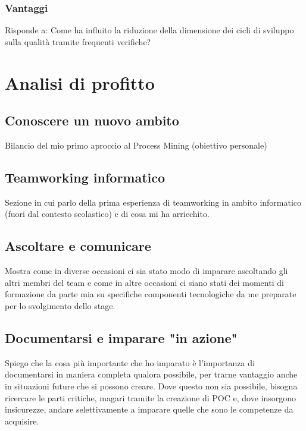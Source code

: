 \subsubsection{Vantaggi}
Risponde a: Come ha influito la riduzione della dimensione dei cicli di sviluppo sulla qualità tramite frequenti verifiche?
\section{Analisi di profitto}
\subsection{Conoscere un nuovo ambito}
Bilancio del mio primo aproccio al Process Mining (obiettivo personale)

\subsection{Teamworking informatico}
Sezione in cui parlo della prima esperienza di teamworking in ambito informatico (fuori dal contesto scolastico) e di cosa mi ha arricchito.

\subsection{Ascoltare e comunicare}
Mostra come in diverse occasioni ci sia stato modo di imparare ascoltando gli altri membri del team e come in altre occasioni ci siano stati dei momenti di formazione da parte mia su specifiche componenti tecnologiche da me preparate per lo svolgimento dello stage.

\subsection{Documentarsi e imparare "in azione"}
Spiego che la cosa più importante che ho imparato è l'importanza di documentarsi in maniera completa qualora possibile, per trarne vantaggio anche in situazioni future che si possono creare. Dove questo non sia possibile, bisogna ricercare le parti critiche, magari tramite la creazione di POC e, dove insorgono insicurezze, andare selettivamente a imparare quelle che sono le competenze da acquisire.

